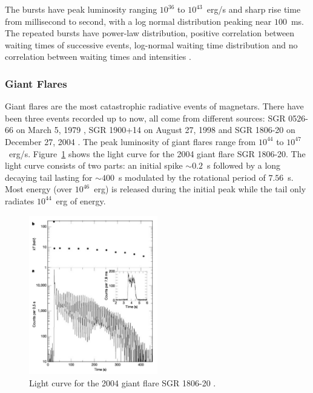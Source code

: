The bursts have peak luminosity ranging $10^{36}$ to $10^{43}$~erg/s and sharp rise time from millisecond to second, with a log normal distribution peaking near $100$~ms.
The repeated bursts have power-law distribution, positive correlation between waiting times of successive events, log-normal waiting time distribution and no correlation between waiting times and intensities \citep{1996Natur.382..518C}.

\subsubsection{Giant Flares}
Giant flares are the most catastrophic radiative events of magnetars. 
There have been three events recorded up to now, all come from different sources: SGR 0526-66 on March 5, 1979 \citep{1980ApJ...237L...7E}, SGR 1900+14 on August 27, 1998 \citep{1999Natur.397...41H} and SGR 1806-20 on December 27, 2004 \citep{2005Natur.434.1098H,2005ApJ...624L.105M,2007ApJ...661..458B}.
The peak luminosity of giant flares range from $10^{44}$ to $10^{47}$~erg/s.
Figure~\ref{fig:gf-light-curve} shows the light curve for the 2004 giant flare SGR 1806-20. 
The light curve consists of two parts: an initial spike $\sim 0.2$~s followed by a long decaying tail lasting for $\sim 400$~s modulated by the rotational period of $7.56$~s.
Most energy (over $10^{46}$~erg) is released during the initial peak while the tail only radiates $10^{44}$~erg of energy.
%
\begin{figure}[h]
  \centering
  \includegraphics[width=0.5\textwidth]{pics/intro/gf.png}
  \caption[Light curve for the 2004 giant flare SGR 1806-20]{Light curve for the 2004 giant flare SGR 1806-20 \citep{2005Natur.434.1098H}.}
  \label{fig:gf-light-curve}
\end{figure}
%

